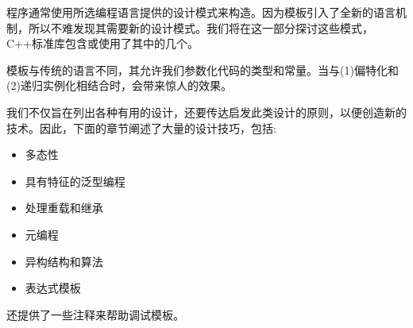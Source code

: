 程序通常使用所选编程语言提供的设计模式来构造。因为模板引入了全新的语言机制，所以不难发现其需要新的设计模式。我们将在这一部分探讨这些模式，C++标准库包含或使用了其中的几个。

模板与传统的语言不同，其允许我们参数化代码的类型和常量。当与(1)偏特化和(2)递归实例化相结合时，会带来惊人的效果。

我们不仅旨在列出各种有用的设计，还要传达启发此类设计的原则，以便创造新的技术。因此，下面的章节阐述了大量的设计技巧，包括:

\begin{itemize}
\item 
多态性

\item 
具有特征的泛型编程

\item 
处理重载和继承

\item 
元编程

\item 
异构结构和算法

\item 
表达式模板
\end{itemize}

还提供了一些注释来帮助调试模板。